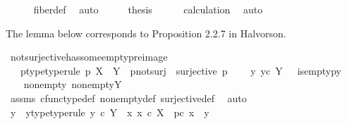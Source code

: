 \begin{isabellebody}
\ \ \ \ \isamarkupfalse%
\ fiber{\isacharunderscore}{\kern0pt}def\ \isamarkupfalse%
\ auto\isanewline
\ \ \isamarkupfalse%
\ \isamarkupfalse%
\ {\isacharquery}{\kern0pt}thesis\isanewline
\ \ \ \ \isamarkupfalse%
\ calculation\ \isamarkupfalse%
\ auto\isanewline
{}\isamarkupfalse%
%
\endisatagproof
{\isafoldproof}%
%
\isadelimproof
%
\endisadelimproof
%
\begin{isamarkuptext}%
The lemma below corresponds to Proposition 2.2.7 in Halvorson.%
\end{isamarkuptext}\isamarkuptrue%
\isamarkupfalse%
\ not{\isacharunderscore}{\kern0pt}surjective{\isacharunderscore}{\kern0pt}has{\isacharunderscore}{\kern0pt}some{\isacharunderscore}{\kern0pt}empty{\isacharunderscore}{\kern0pt}preimage{\isacharcolon}{\kern0pt}\isanewline
\ \ \ p{\isacharunderscore}{\kern0pt}type{\isacharbrackleft}{\kern0pt}type{\isacharunderscore}{\kern0pt}rule{\isacharbrackright}{\kern0pt}{\isacharcolon}{\kern0pt}\ {\isachardoublequoteopen}p{\isacharcolon}{\kern0pt}\ X\ {\isasymrightarrow}\ Y{\isachardoublequoteclose}\ \ p{\isacharunderscore}{\kern0pt}not{\isacharunderscore}{\kern0pt}surj{\isacharcolon}{\kern0pt}\ {\isachardoublequoteopen}{\isasymnot}\ surjective\ p{\isachardoublequoteclose}\isanewline
\ \ \ {\isachardoublequoteopen}{\isasymexists}\ y{\isachardot}{\kern0pt}\ y{\isasymin}\isactrlsub c\ Y\ {\isasymand}\ \ is{\isacharunderscore}{\kern0pt}empty{\isacharparenleft}{\kern0pt}p\isactrlsup {\isacharminus}{\kern0pt}y{\isacharbraceright}{\kern0pt}{\isacharparenright}{\kern0pt}{\isachardoublequoteclose}\isanewline
%
\isadelimproof
%
\endisadelimproof
%
\isatagproof
{}\isamarkupfalse%
\ {\isacharminus}{\kern0pt}\isanewline
\ \ \isamarkupfalse%
\ nonempty{\isacharcolon}{\kern0pt}\ {\isachardoublequoteopen}nonempty{\isacharparenleft}{\kern0pt}Y{\isacharparenright}{\kern0pt}{\isachardoublequoteclose}\isanewline
\ \ \ \ \isamarkupfalse%
\ assms\ cfunc{\isacharunderscore}{\kern0pt}type{\isacharunderscore}{\kern0pt}def\ nonempty{\isacharunderscore}{\kern0pt}def\ surjective{\isacharunderscore}{\kern0pt}def\ \isamarkupfalse%
\ auto\isanewline
\ \ \isamarkupfalse%
\ y{}\ \ y{}{\isacharunderscore}{\kern0pt}type{\isacharbrackleft}{\kern0pt}type{\isacharunderscore}{\kern0pt}rule{\isacharbrackright}{\kern0pt}{\isacharcolon}{\kern0pt}\ {\isachardoublequoteopen}y{}\ {\isasymin}\isactrlsub c\ Y{\isachardoublequoteclose}\ {\isachardoublequoteopen}{\isasymforall}\ x{\isachardot}{\kern0pt}\ x\ {\isasymin}\isactrlsub c\ X\ {\isasymlongrightarrow}\ p{\isasymcirc}\isactrlsub c\ x\ {\isasymnoteq}\ y{}{\isachardoublequoteclose}\isanewline

\end{isabellebody}
